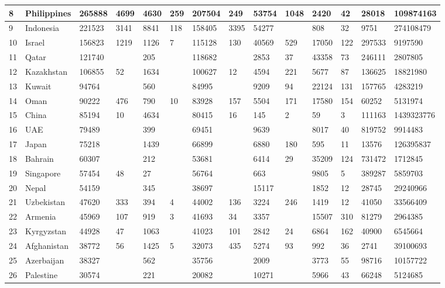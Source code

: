 \begin{landscape}
\begin{footnotesize}
\begin{longtable}{ | l | l | l | l | l | l | l | l | l | l | l | l | l | l | }
	8 & Philippines & 265888 & 4699 & 4630 & 259 & 207504 & 249 & 53754 & 1048 & 2420 & 42 & 28018 & 109874163 \\ \hline
	9 & Indonesia & 221523 & 3141 & 8841 & 118 & 158405 & 3395 & 54277 &  & 808 & 32 & 9751 & 274108479 \\ \hline
	10 & Israel & 156823 & 1219 & 1126 & 7 & 115128 & 130 & 40569 & 529 & 17050 & 122 & 297533 & 9197590 \\ \hline
	11 & Qatar & 121740 &  & 205 &  & 118682 &  & 2853 & 37 & 43358 & 73 & 246111 & 2807805 \\ \hline
	12 & Kazakhstan & 106855 & 52 & 1634 &  & 100627 & 12 & 4594 & 221 & 5677 & 87 & 136625 & 18821980 \\ \hline
	13 & Kuwait & 94764 &  & 560 &  & 84995 &  & 9209 & 94 & 22124 & 131 & 157765 & 4283219 \\ \hline
	14 & Oman & 90222 & 476 & 790 & 10 & 83928 & 157 & 5504 & 171 & 17580 & 154 & 60252 & 5131974 \\ \hline
	15 & China & 85194 & 10 & 4634 &  & 80415 & 16 & 145 & 2 & 59 & 3 & 111163 & 1439323776 \\ \hline
	16 & UAE & 79489 &  & 399 &  & 69451 &  & 9639 &  & 8017 & 40 & 819752 & 9914483 \\ \hline
	17 & Japan & 75218 &  & 1439 &  & 66899 &  & 6880 & 180 & 595 & 11 & 13576 & 126395837 \\ \hline
	18 & Bahrain & 60307 &  & 212 &  & 53681 &  & 6414 & 29 & 35209 & 124 & 731472 & 1712845 \\ \hline
	19 & Singapore & 57454 & 48 & 27 &  & 56764 &  & 663 &  & 9805 & 5 & 389287 & 5859703 \\ \hline
	20 & Nepal & 54159 &  & 345 &  & 38697 &  & 15117 &  & 1852 & 12 & 28745 & 29240966 \\ \hline
	21 & Uzbekistan & 47620 & 333 & 394 & 4 & 44002 & 136 & 3224 & 246 & 1419 & 12 & 41050 & 33566409 \\ \hline
	22 & Armenia & 45969 & 107 & 919 & 3 & 41693 & 34 & 3357 &  & 15507 & 310 & 81279 & 2964385 \\ \hline
	23 & Kyrgyzstan & 44928 & 47 & 1063 &  & 41023 & 101 & 2842 & 24 & 6864 & 162 & 40900 & 6545664 \\ \hline
	24 & Afghanistan & 38772 & 56 & 1425 & 5 & 32073 & 435 & 5274 & 93 & 992 & 36 & 2741 & 39100693 \\ \hline
	25 & Azerbaijan & 38327 &  & 562 &  & 35756 &  & 2009 &  & 3773 & 55 & 98716 & 10157722 \\ \hline
	26 & Palestine & 30574 &  & 221 &  & 20082 &  & 10271 &  & 5966 & 43 & 66248 & 5124685 \\ \hline

\end{longtable}
\end{footnotesize}
\end{landscape}
